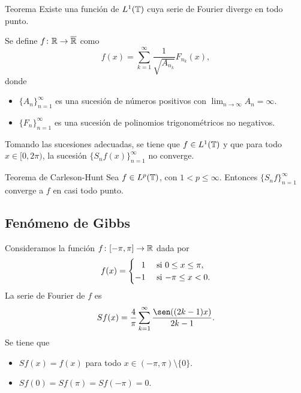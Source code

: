 \documentclass{beamer}
\begin{document}
\begin{frame}
    \begin{block}{Teorema}
        Existe una función de $L^1(\mathbb T)$ cuya serie de Fourier diverge en todo punto.
    \end{block}
    \pause
    Se define $f \colon \mathbb R\to\overline{\mathbb R}$ como
    \[f(x) = \sum_{k=1}^\infty \frac{1}{\sqrt{A_{n_k}}}F_{n_k}(x),\]
    donde
    \begin{itemize}
        \item $\{A_n\}_{n=1}^\infty$ es una sucesión de números positivos con $\lim_{n\to\infty}A_n = \infty$.
        \item $\{F_n\}_{n=1}^\infty$ es una sucesión de polinomios trigonométricos no negativos.
    \end{itemize}
    Tomando las sucesiones adecuadas, se tiene que $f \in L^1(\mathbb T)$ y que para todo $x\in[0,2\pi)$, la sucesión $\{S_nf(x)\}_{n=1}^\infty$ no converge.
\end{frame}

\begin{frame}
    \begin{block}{Teorema de Carleson-Hunt}
        Sea $f \in L^p(\mathbb T)$, con $1 < p \leq \infty$. Entonces $\{S_nf\}_{n=1}^\infty$ converge a $f$ en casi todo punto.    
    \end{block}
\end{frame}

\subsection{Fenómeno de Gibbs}

\begin{frame}
    \begin{block}{}
        Consideramos la función $f \colon [-\pi,\pi]\to\mathbb R$ dada por
        \[f(x) = \begin{cases}
            \phantom{-}1 & $ si $ 0 \leq x \leq \pi, \\
            -1 & $ si $ -\pi \leq x < 0.
        \end{cases}\]
        \pause
        La serie de Fourier de $f$ es
        \[Sf(x) = \frac{4}{\pi}\sum_{k=1}^\infty\frac{\sen((2k-1)x)}{2k-1}.\]
        \pause
        Se tiene que
        \begin{itemize}
            \item $Sf(x) = f(x)$ para todo $x \in (-\pi,\pi)\setminus\{0\}$.
            \item $Sf(0) = Sf(\pi) = Sf(-\pi) = 0$.
        \end{itemize}
    \end{block}
\end{frame}
\end{document}
